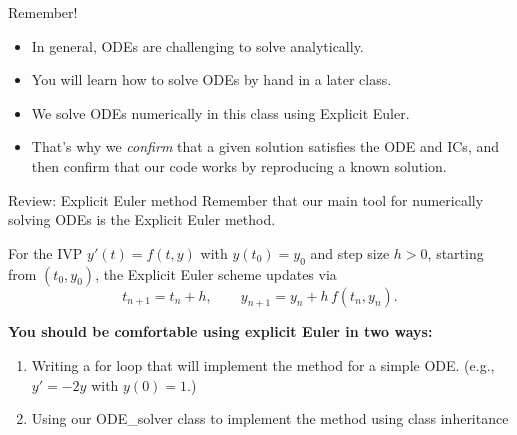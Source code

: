 \documentclass{beamer}
\begin{document}
\begin{frame}{Remember!}
\begin{itemize}
\item In general, ODEs are challenging to solve analytically.
\item You will learn how to solve ODEs by hand in a later class.
\item We solve ODEs numerically in this class using Explicit Euler.
\item That's why we \textit{confirm} that a given solution satisfies the ODE and ICs, and then confirm that our code works by reproducing a known solution.
\end{itemize}
\end{frame}
\begin{frame}{Review: Explicit Euler method}
  Remember that our main tool for numerically solving ODEs is the Explicit Euler method.

  \begin{definition}
    For the IVP \(y'(t)=f(t,y)\) with \(y(t_0)=y_0\) and step size \(h>0\), starting from $(t_0,y_0)$, the Explicit Euler scheme updates via
    \[
      t_{n+1}=t_n+h, \qquad
      y_{n+1}=y_n + h\,f(t_n,y_n).
    \]
  \end{definition}
\textbf{You should be comfortable using explicit Euler in two ways:}
\begin{enumerate}
  \item Writing a for loop that will implement the method for a simple ODE. (e.g., \(y'=-2y\) with \(y(0)=1\).)
  \item Using our ODE\_solver class to implement the method using class inheritance
\end{enumerate}
\end{frame}
\end{document}
